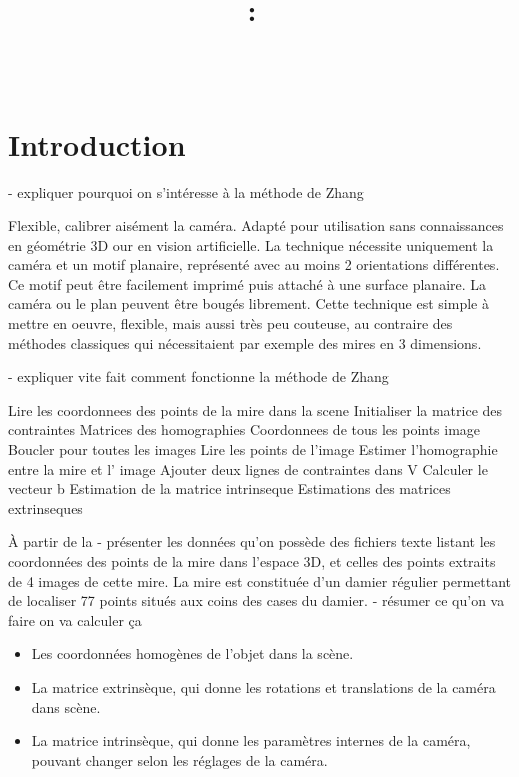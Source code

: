 \documentclass{article}
\title{
\vspace{2in}
\textmd{\textbf{\hmwkClass:\ \hmwkTitle}}\\
\normalsize\vspace{0.1in}\small{\hmwkDueDate}\\
\vspace{3in}
}
\author{\textbf{\hmwkAuthorName}}
\date{} %
\begin{document}
\maketitle



\newpage
\tableofcontents
\newpage


\section{Introduction}

- expliquer pourquoi on s'intéresse à la méthode de Zhang

Flexible, calibrer aisément la caméra.
Adapté pour utilisation sans connaissances en géométrie 3D our en vision artificielle.
La technique nécessite uniquement la caméra et un motif planaire, représenté avec au moins 2 orientations différentes.
Ce motif peut être facilement imprimé puis attaché à une surface planaire.
La caméra ou le plan peuvent être bougés librement.
Cette technique est simple à mettre en oeuvre, flexible, mais aussi très peu couteuse, au contraire des méthodes classiques qui nécessitaient par exemple des mires en 3 dimensions.

- expliquer vite fait comment fonctionne la méthode de Zhang

  Lire les coordonnees des points de la mire dans la scene
  Initialiser la matrice des contraintes
  Matrices des homographies
  Coordonnees de tous les points image
  Boucler pour toutes les images
    Lire les points de l'image
    Estimer l'homographie entre la mire et l' image
    Ajouter deux lignes de contraintes dans V
  Calculer le vecteur b
  Estimation de la matrice intrinseque
  Estimations des matrices extrinseques

À partir de la
- présenter les données qu'on possède
   des fichiers texte listant les coordonnées des points de la mire dans l'espace 3D, et celles des points extraits de 4 images de cette mire. La mire est constituée d'un damier régulier permettant de localiser 77 points situés aux coins des cases du damier.
- résumer ce qu'on va faire
on va calculer ça
  \begin{itemize}
 \item Les coordonnées homogènes de l'objet dans la scène.
 \item La matrice extrinsèque, qui donne les rotations et translations de la caméra dans scène.
 \item La matrice intrinsèque, qui donne les paramètres internes de la caméra, pouvant changer
 selon les réglages de la caméra.
\end{itemize}
\end{document}
